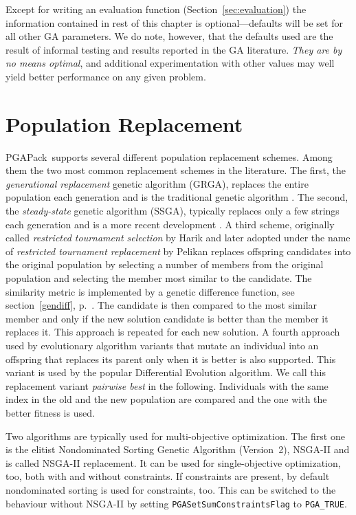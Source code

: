\documentclass{report}
\newcommand{\pga}{PGAPack}
\begin{document}
Except for writing an evaluation function (Section~\ref{sec:evaluation}) the
information contained in rest of this chapter is optional---defaults will be
set for all other GA parameters.  We do note, however, that the defaults used
are the result of informal testing and results reported in the GA literature.
{\em They are by no means optimal}, and additional experimentation
with other values may well yield better performance on any given problem.


\section{Population Replacement}\label{sec:population-replacement}
\pga\ supports several different population replacement schemes.
Among them the two most common replacement schemes in the literature.
The first,
the {\em generational replacement} genetic algorithm (GRGA), replaces the
entire population each generation and is the traditional genetic algorithm
\cite{Ho92}.  The second, the {\em steady-state} genetic algorithm (SSGA),
typically replaces only a few strings each generation and is a more recent
development
\cite{Sy89,Wh89,WhKa88}.
A third scheme, originally called \textit{restricted tournament
selection} by Harik \cite{Har94,Har95} and later adopted under the name of
\textit{restricted tournament replacement} by Pelikan \cite{Pel05}
replaces offspring candidates into the original population by selecting
a number of members from the original population and selecting the
member most similar to the candidate. The similarity metric is
implemented by a genetic difference function, see
section~\ref{gendiff}, p.~\pageref{gendiff}.
The candidate is then compared to the most similar member and only if
the new solution candidate is better than the member it replaces it.
This approach is repeated for each new solution.
A fourth approach used by evolutionary algorithm variants that mutate an
individual into an offspring that replaces its parent only when it is
better is also supported. This variant is used by the popular
Differential Evolution \cite{SP95,SP97,PSL05} algorithm.
We call this replacement variant
\textit{pairwise best} in the following. Individuals with the same index
in the old and the new population are compared and the one with the
better fitness is used.

Two algorithms are typically used for multi-objective optimization.
The first one is
the elitist Nondominated Sorting Genetic Algorithm (Version~2), NSGA-II
\cite{DPAM02} and is called NSGA-II replacement. It can be used for
single-objective optimization, too, both with and without constraints.
If constraints are present, by default nondominated sorting is used for
constraints, too.  This can be switched to the behaviour without NSGA-II
by setting \verb+PGASetSumConstraintsFlag+ to \verb+PGA_TRUE+.
\end{document}
